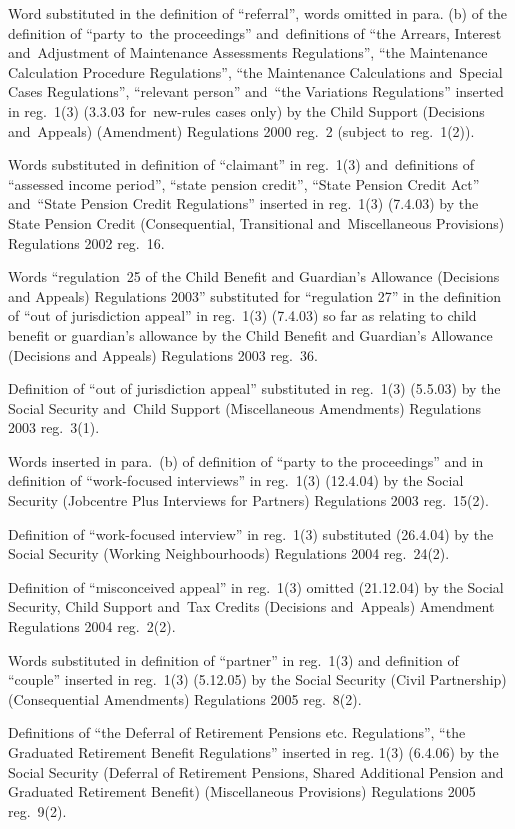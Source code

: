 \documentclass[12pt,a4paper]{article}
\begin{document}
{Word substituted in the definition of ``referral'', words omitted in para. (b) of the definition of ``party to~the proceedings'' and~definitions of ``the Arrears, Interest and~Adjustment of Maintenance Assessments Regulations'', ``the Maintenance Calculation Procedure Regulations'', ``the Maintenance Calculations and~Special Cases Regulations'', ``relevant person'' and~``the Variations Regulations'' inserted in reg.~1(3) (3.3.03 for~new-rules cases only) by the Child Support (Decisions and~Appeals) (Amendment) Regulations 2000 reg.~2 (subject to~reg.~1(2)).

Words substituted in definition of ``claimant'' in reg.~1(3) and~definitions of ``assessed income period'', ``state pension credit'', ``State Pension Credit Act'' and~``State Pension Credit Regulations'' inserted in reg.~1(3) (7.4.03) by the State Pension Credit (Consequential, Transitional and~Miscellaneous Provisions) Regulations 2002 reg.~16.

Words ``regulation~25 of the Child Benefit and Guardian's Allowance (Decisions and Appeals) Regulations 2003'' substituted for ``regulation 27'' in the definition of ``out of jurisdiction appeal'' in reg.~1(3) (7.4.03) so far as relating to child benefit or guardian's allowance by the Child Benefit and Guardian’s Allowance (Decisions and Appeals) Regulations 2003 reg.~36.

Definition of ``out of jurisdiction appeal'' substituted in reg.~1(3) (5.5.03) by the Social Security and~Child Support (Miscellaneous Amendments) Regulations 2003 reg.~3(1).

Words inserted in para.~(b) of definition of ``party to the proceedings'' and in definition of ``work-focused interviews'' in reg.~1(3) (12.4.04) by the Social Security (Jobcentre Plus Interviews for Partners) Regulations 2003 reg.~15(2).

Definition of ``work-focused interview'' in reg.~1(3) substituted (26.4.04) by the Social Security (Working Neighbourhoods) Regulations 2004 reg.~24(2).

Definition of ``misconceived appeal'' in reg.~1(3) omitted (21.12.04) by the Social Security, Child Support and~Tax Credits (Decisions and~Appeals) Amendment Regulations 2004 reg.~2(2).

Words substituted in definition of ``partner'' in reg.~1(3) and definition of ``couple'' inserted in reg.~1(3) (5.12.05) by the Social Security (Civil Partnership) (Consequential Amendments) Regulations 2005 reg.~8(2).

Definitions of ``the Deferral of Retirement Pensions etc. Regulations'', ``the Graduated Retirement Benefit Regulations'' inserted in reg. 1(3) (6.4.06) by the Social Security (Deferral of Retirement Pensions, Shared Additional Pension and Graduated Retirement Benefit) (Miscellaneous Provisions) Regulations 2005 reg.~9(2).

}
\end{document}
